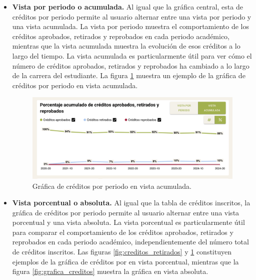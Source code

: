 \begin{itemize}
	\item \textbf{Vista por periodo o acumulada.} Al igual que la gráfica central, esta de créditos por periodo permite al usuario alternar entre una vista por periodo y una vista acumulada. La vista por periodo muestra el comportamiento de los créditos aprobados, retirados y reprobados en cada periodo académico, mientras que la vista acumulada muestra la evolución de esos créditos a lo largo del tiempo. La vista acumulada es particularmente útil para ver cómo el número de créditos aprobados, retirados y reprobados ha cambiado a lo largo de la carrera del estudiante. La figura \ref{fig:creditos_acumulados} muestra un ejemplo de la gráfica de créditos por periodo en vista acumulada.

	      \begin{figure}[H]
		      \noindent
		      \hspace{\leftmargin}
		      \begin{minipage}{\dimexpr\linewidth-\leftmargin\relax}
			      \includegraphics[width=\linewidth]{assets/nes/creditos_acumulados.png}
			      \caption{Gráfica de créditos por periodo en vista acumulada.}
			      \label{fig:creditos_acumulados}
		      \end{minipage}
	      \end{figure}

	\item \textbf{Vista porcentual o absoluta.} Al igual que la tabla de créditos inscritos, la gráfica de créditos por periodo permite al usuario alternar entre una vista porcentual y una vista absoluta. La vista porcentual es particularmente útil para comparar el comportamiento de los créditos aprobados, retirados y reprobados en cada periodo académico, independientemente del número total de créditos inscritos. Las figuras \ref{fig:creditos_retirados} y \ref{fig:creditos_acumulados} constituyen ejemplos de la gráfica de créditos por en vista porcentual, mientras que la figura \ref{fig:grafica_creditos} muestra la gráfica en vista absoluta.
\end{itemize}

